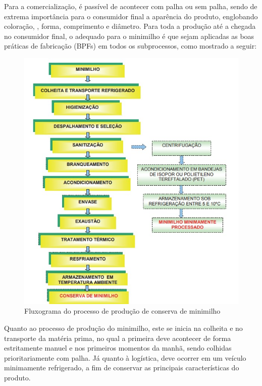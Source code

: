 \documentclass[
	12pt,				%
	openright,			%
	oneside,			%
	a4paper,			%
	english,			%
	french,				%
	spanish,			%
	brazil				%
	]{abntex2}
\begin{document}
Para a comercialização, é passível de acontecer com palha ou sem palha, sendo de extrema importância para o consumidor final a aparência do produto, englobando coloração, , forma, comprimento e diâmetro. Para toda a produção até a chegada no consumidor final, o adequado para o minimilho é que sejam aplicadas as boas práticas de fabricação (BPFs) em todos os subprocessos, como mostrado a seguir:


\begin{figure}[H]
\begin{center}
\caption{Fluxograma do processo de produção de conserva de minimilho}
\includegraphics[scale=0.4]{Imagens/WhatsApp Image 2022-10-09 at 14.25.06.jpeg} 
\end{center}
\end{figure}

Quanto ao processo de produção do minimilho, este se inicia na colheita e no transporte da matéria prima, no qual a primeira deve acontecer de forma estritamente manuel e nos primeiros momentos da manhã, sendo colhidas prioritariamente com palha. Já quanto à logística, deve ocorrer em um veículo minimamente refrigerado, a fim de conservar as principais características do produto.
\end{document}
